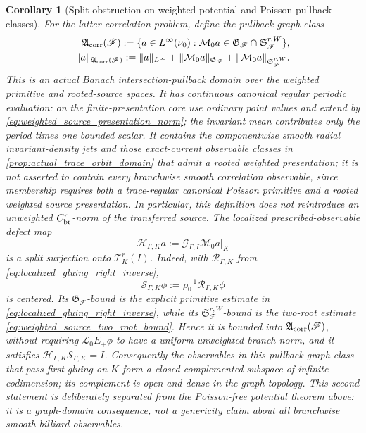 \documentclass[11pt]{amsart}
\theoremstyle{compactplain}
\newtheorem{corollary}[theorem]{Corollary}
\theoremstyle{compactdefinition}
\theoremstyle{compactremark}
\newcommand{\Ltransfer}{\mathscr L}
\begin{document}
\begin{corollary}[Split obstruction on weighted potential and Poisson-pullback classes]
For the latter correlation problem, define the pullback graph class
\begin{equation}
\label{eq:correlation_observable_graph_domain}
\begin{split}
 \mathfrak A_{\rm corr}(\mathscr F)
 :=\{a\in L^\infty(\nu_0):
       \mathcal M_0a\in
       \mathfrak G_{\mathscr F}\cap
       \mathfrak S_{\mathscr F}^{r,W}\},
 \\
 \|a\|_{\mathfrak A_{\rm corr}(\mathscr F)}
 :=\|a\|_{L^\infty}
   +\|\mathcal M_0a\|_{\mathfrak G_{\mathscr F}}
   +\|\mathcal M_0a\|_{\mathfrak S_{\mathscr F}^{r,W}}.
\end{split}
\end{equation}
This is an actual Banach intersection-pullback domain over the weighted
primitive and rooted-source spaces.  It has continuous canonical regular
periodic evaluation: on the finite-presentation core use ordinary point
values and extend by
\eqref{eq:weighted_source_presentation_norm}; the invariant mean contributes
only the period times one bounded scalar.  It contains the
componentwise smooth radial invariant-density jets and those exact-current
observable classes in \cref{prop:actual_trace_orbit_domain} that admit a
rooted weighted presentation; it is not
asserted to contain every branchwise smooth correlation observable, since
membership requires both a trace-regular canonical Poisson primitive and a
rooted weighted source presentation.  In particular, this definition does
not reintroduce an unweighted \(C_{\rm br}^r\)-norm of the transferred
source.
The localized prescribed-observable defect map
\begin{equation}
\label{eq:prescribed_observable_gluing_map}
 \mathcal H_{\Gamma,K}a
 :=\mathcal G_{\Gamma,I}\mathcal M_0a\big|_K
\end{equation}
is a split surjection onto \(\mathcal T_K^r(I)\).  Indeed, with
\(\mathcal R_{\Gamma,K}\) from
\eqref{eq:localized_gluing_right_inverse},
\[
 \mathcal S_{\Gamma,K}\phi
 :=\rho_0^{-1}\mathcal R_{\Gamma,K}\phi
\]
is centered.  Its \(\mathfrak G_{\mathscr F}\)-bound is the explicit
primitive estimate in
\eqref{eq:localized_gluing_right_inverse}, while its
\(\mathfrak S_{\mathscr F}^{r,W}\)-bound is the two-root estimate
\eqref{eq:weighted_source_two_root_bound}.  Hence it is bounded into
\(\mathfrak A_{\rm corr}(\mathscr F)\), without requiring
\(\Ltransfer_0E_+\phi\) to have a uniform unweighted branch norm, and it satisfies
\(\mathcal H_{\Gamma,K}\mathcal S_{\Gamma,K}=I\).
Consequently the observables in this pullback graph class that
pass first gluing on \(K\) form a closed complemented subspace of infinite
codimension; its complement is open and dense in the graph topology.  This
second statement is deliberately separated from the Poisson-free potential
theorem above: it is a graph-domain consequence, not a genericity claim about
all branchwise smooth billiard observables.



\end{corollary}
\end{document}
